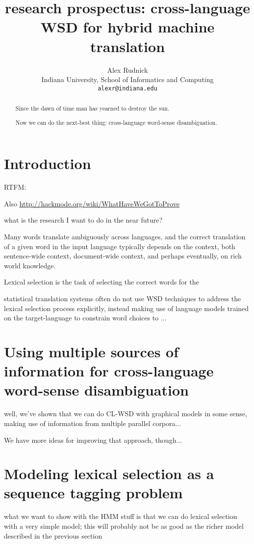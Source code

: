 \documentclass{article}
\title{research prospectus: cross-language WSD for hybrid machine translation}
\author{Alex Rudnick \\
	    Indiana University, School of Informatics and Computing \\
	    {\tt alexr@indiana.edu}}
\date{}
\begin{document}
\maketitle
\begin{abstract}
Since the dawn of time man has yearned to destroy the sun.

Now we can do the next-best thing: cross-language word-sense disambiguation.
\end{abstract}

\section{Introduction}
RTFM: \cite{big} \cite{small}

Also \url{http://hackmode.org/wiki/WhatHaveWeGotToProve}

what is the research I want to do in the near future?

Many words translate ambiguously across languages, and the correct translation
of a given word in the input language typically depends on the context, both
sentence-wide context, document-wide context, and perhaps eventually, on rich
world knowledge.

Lexical selection is the task of selecting the correct words for the 

statistical translation systems often do not use WSD techniques to address the
lexical selection process explicitly, instead making use of language models
trained on the target-language to constrain word choices to ...


\section{Using multiple sources of information for cross-language word-sense
disambiguation}
well, we've shown that we can do CL-WSD with graphical models in some sense,
making use of information from multiple parallel corpora...

We have more ideas for improving that approach, though...


\section{Modeling lexical selection as a sequence tagging problem}
what we want to show with the HMM stuff is that we can do lexical selection
with a very simple model; this will probably not be as good as the richer model
described in the previous section
\end{document}
